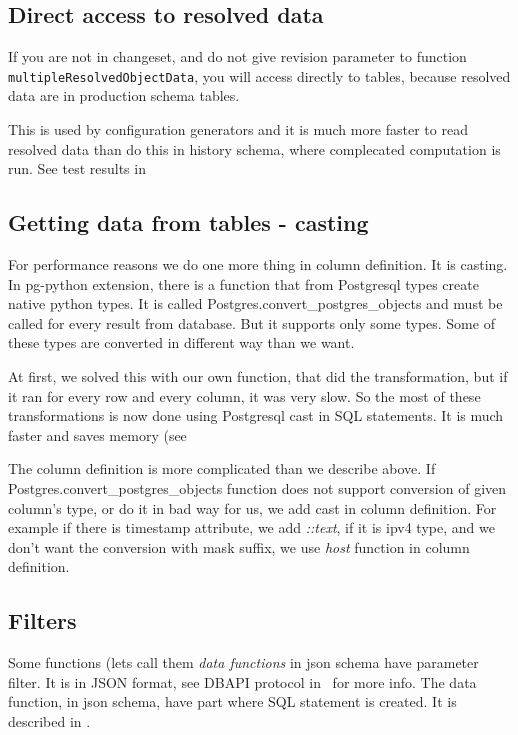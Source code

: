 \documentclass[deska]{subfiles}
\begin{document}
\subsection{Direct access to resolved data}
\label{sec:direct-access}
If you are not in changeset, and do not give revision parameter to function {\tt multipleResolvedObjectData},
you will access directly to tables, because resolved data are in production schema tables.

This is used by configuration generators and it is much more faster to read
resolved data than do this in history schema, where complecated computation is run.
See test results in 

\subsection{Getting data from tables - casting}
\label{sec:cast}
For performance reasons we do one more thing in column definition. It is casting.
In pg-python extension, there is a function that from Postgresql types create native python types.
It is called Postgres.convert\_postgres\_objects
and must be called for every result from database. But it supports only some types.
Some of these types are converted in different way than we want.

At first, we solved this with our own function, that did the transformation, but if it ran for every
row and every column, it was very slow. So the most of these transformations is now done using Postgresql cast
in SQL statements. It is much faster and saves memory (see 

The column definition is more complicated than we describe above. If
Postgres.convert\_postgres\_objects function 
does not support conversion of given column's type, or do it in bad way for us, we add cast in column definition.
For example if there is timestamp attribute, we add {\em ::text}, if it is ipv4 type, and we don't want
the conversion with mask suffix, we use {\em host} function in column definition.


\subsection{Filters}
\label{sec:filters}
Some functions (lets call them {\em data functions} in json schema have parameter filter. It is in JSON format,
see DBAPI protocol in~ for more info.
The data function, in json schema, have part where SQL statement is created. It is described in
.
\end{document}
